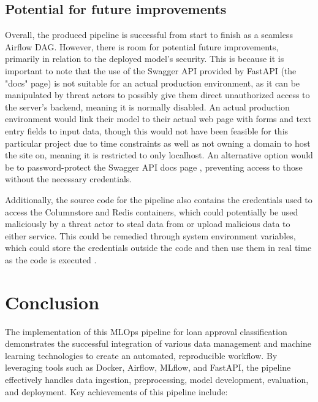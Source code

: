 \documentclass[12pt]{report}
\newcommand{\para}{\vspace{7pt}\noindent}
\begin{document}
\section{Potential for future improvements}
Overall, the produced pipeline is successful from start to finish as a seamless Airflow DAG. However, there is room 
for potential future improvements, primarily in relation to the deployed model's security. This is because it is 
important to note that the use of the Swagger API provided by FastAPI (the "docs" page) is not suitable for an actual production 
environment, as it can be manipulated by threat actors to possibly give them direct unauthorized access to the 
server's backend, meaning it is normally disabled. An actual production environment would link their 
model to their actual web page with forms and text entry fields to input data, though this would not 
have been feasible for this particular project due to time constraints as well as not owning a domain 
to host the site on, meaning it is restricted to only localhost. An alternative option would be to password-protect 
the Swagger API docs page \autocite{ray_securing_2023}, preventing access to those without the necessary credentials.

\para Additionally, the source code for the pipeline also contains the credentials used to access the Columnstore 
and Redis containers, which could potentially be used maliciously by a threat actor to steal data from or upload malicious 
data to either service. This could be remedied through system environment variables, which could store the credentials outside 
the code and then use them in real time as the code is executed \autocite{freecodecamp_python_2023}.  




\chapter*{Conclusion}

The implementation of this MLOps pipeline for loan approval classification demonstrates the successful integration of various
data management and machine learning technologies to create an automated, reproducible workflow. By leveraging tools such as Docker,
Airflow, MLflow, and FastAPI, the pipeline effectively handles data ingestion, preprocessing, model development, evaluation, and 
deployment. Key achievements of this pipeline include:
\end{document}
